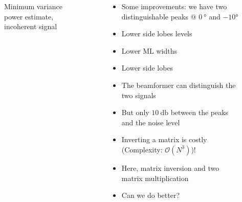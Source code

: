 \documentclass[UKenglish,8pt,aspectratio=1610]{beamer}
\begin{document}
\begin{frame}
\begin{columns}
\begin{column}{0.5\textwidth}
\begin{figure}[h!]
			\caption{Minimum variance power estimate, incoherent signal}
		\end{figure}
	\end{column}
	\begin{column}{0.5\textwidth}
		\begin{itemize}
			\item Some improvements: we have two distinguishable peaks @ $0~\si{\degree}$ and $-10\si{\degree}$
			\item Lower side lobes levels
			\item Lower ML widths
			\item Lower side lobes
			\item The beamformer can distinguish the two signals
			\item But only $10~\si{\decibel}$ between the peaks and the noise level
			\item Inverting a matrix is costly (Complexity: $\mathcal{O}(N^3)$)!
			\item Here, matrix inversion and two matrix multiplication
			\item Can we do better?
		\end{itemize}
	\end{column}
\end{columns}
	\end{frame}
\end{document}
